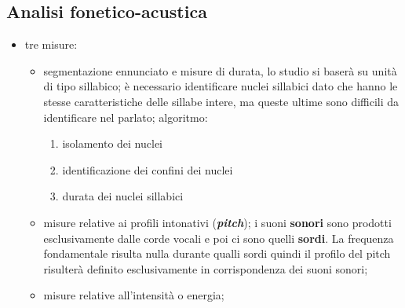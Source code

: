 \documentclass[twoside,twocolumn]{article}
\theoremstyle{definition}
\begin{document}
	\subsection{Analisi fonetico-acustica}
		\begin{itemize}
			\item tre misure:
			\begin{itemize}
				\item segmentazione ennunciato e misure di durata, lo studio si baserà su unità di tipo sillabico; è necessario identificare nuclei sillabici dato che hanno le stesse caratteristiche delle sillabe intere, ma queste ultime sono difficili da identificare nel parlato; algoritmo:
					\begin{enumerate}
						\item isolamento dei nuclei
						\item identificazione dei confini dei nuclei
						\item durata dei nuclei sillabici
					\end{enumerate}
				\item misure relative ai profili intonativi (\textbf{\textit{pitch}}); i suoni \textbf{sonori} sono prodotti esclusivamente dalle corde vocali e poi ci sono quelli \textbf{sordi}. La frequenza fondamentale risulta nulla durante qualli sordi quindi il profilo del pitch risulterà definito esclusivamente in corrispondenza dei suoni sonori;
				\item misure relative all'intensità o energia;
			\end{itemize}
		\end{itemize}
	
\end{document}

